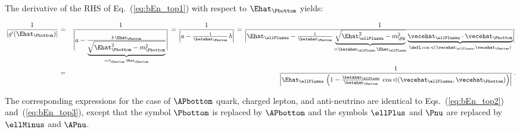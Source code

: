 The derivative of the RHS of Eq.~(\ref{eq:bEn_top1}) with respect to $\Ehat_{\Pbottom}$ yields:
\begin{linenowrapper}
\begin{eqnarray}
\frac{1}{|g^{\prime}(\Ehat_{\Pbottom})|} 
 & = & \frac{1}{\Bigg\lvert a - \frac{b \, \Ehat_{\Pbottom}}{\underbrace{\sqrt{\Ehat_{\Pbottom}^{2} - m_{\Pbottom}^{2}}}_{= \beta_{\Pbottom} \, \Ehat_{\Pbottom}}} \Bigg\rvert}
  = \frac{1}{\left\lvert a - \frac{1}{\betahat_{\Pbottom}} \, b \right\rvert}
  = \frac{1}{\left\lvert \Ehat_{\ellPlusnu} - \frac{1}{\betahat_{\Pbottom}} \,
\smash{\underbrace{\sqrt{\Ehat_{\ellPlusnu}^{2} - m_{\PW}^{2}}}_{= \betahat_{\ellPlusnu} \, \Ehat_{\ellPlusnu}}} \,
\smash{\underbrace{\vecehat_{\ellPlusnu} \cdot \vecehat_{\Pbottom}}_{\defL \cos\sphericalangle(\vecehat_{\ellPlusnu},\vecehat_{\Pbottom})}} \right\rvert} \nonumber \\
 & = & \frac{1}{\left\lvert \Ehat_{\ellPlusnu} \, \left( 1 - \frac{\betahat_{\ellPlusnu}}{\betahat_{\Pbottom}} \, \cos\sphericalangle(\vecehat_{\ellPlusnu},\vecehat_{\Pbottom}) \right) \right\rvert} \, .
\label{eq:bEn_top3}
\end{eqnarray}
\end{linenowrapper}

The corresponding expressions for the case of $\APbottom$ quark, charged lepton, and anti-neutrino are identical to Eqs.~(\ref{eq:bEn_top2}) and~(\ref{eq:bEn_top3}),
except that the symbol $\Pbottom$ is replaced by $\APbottom$ and the symbols $\ellPlus$ and $\Pnu$ are replaced by $\ellMinus$ and $\APnu$.
